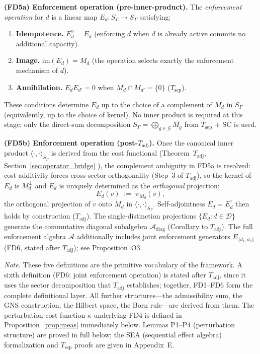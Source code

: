 \documentclass[11pt]{article}
\theoremstyle{remark}
\begin{document}
\begin{tcolorbox}[defbox, title={$\mathrm{FD5}$ (Enforcement Operation): Two-Stage Definition}]

\noindent\textbf{(FD5a) Enforcement operation (pre-inner-product).}
The \emph{enforcement operation} for $d$ is a linear map $E_d: S_\Gamma \to S_\Gamma$ satisfying:
\begin{enumerate}[nosep,leftmargin=2em,itemsep=2pt,label=(\alph*)]
  \item \textbf{Idempotence.}  $E_d^2 = E_d$ (enforcing $d$ when $d$ is already active commits no additional capacity).
  \item \textbf{Image.}  $\mathrm{im}(E_d) = M_d$ (the operation selects exactly the enforcement mechanism of $d$).
  \item \textbf{Annihilation.}  $E_d E_{d'} = 0$ when $M_d \cap M_{d'} = \{0\}$ ($T_{\mathrm{sep}}$).
\end{enumerate}
These conditions determine $E_d$ up to the choice of a complement of $M_d$ in $S_\Gamma$ (equivalently, up to the choice of kernel).  No inner product is required at this stage; only the direct-sum decomposition $S_\Gamma = \bigoplus_{g \in \mathcal{G}} M_g$ from $T_{\mathrm{sep}}$ + SC is used.

\medskip
\noindent\textbf{(FD5b) Enforcement operation (post-$T_{\mathrm{adj}}$).}
Once the canonical inner product $\langle\cdot,\cdot\rangle_{S_\Gamma}$ is derived from the cost functional (Theorem~$T_{\mathrm{adj}}$, Section~\ref{sec:operator_bridge} ), the complement ambiguity in FD5a is resolved: cost additivity forces cross-sector orthogonality (Step~3 of $T_{\mathrm{adj}}$), so the kernel of $E_d$ is $M_d^\perp$ and $E_d$ is uniquely determined as the \emph{orthogonal} projection:
\[
E_d(v) \;:=\; \pi_{M_d}(v),
\]
the orthogonal projection of $v$ onto $M_d$ in $\langle\cdot,\cdot\rangle_{S_\Gamma}$.  Self-adjointness $E_d = E_d^\dagger$ then holds by construction ($T_{\mathrm{adj}}$).  The single-distinction projections $\{E_d : d \in \mathcal{D}\}$ generate the commutative diagonal subalgebra $\mathcal{A}_{\mathrm{diag}}$ (Corollary to $T_{\mathrm{adj}}$).  The full enforcement algebra $\mathcal{A}$ additionally includes joint enforcement generators $E_{\{d_1,d_2\}}$ (FD6, stated after $T_{\mathrm{adj}}$); see Proposition~O3.

\medskip
\noindent\textit{Note.} These five definitions are the primitive vocabulary of the framework.  A sixth definition (FD6: joint enforcement operation) is stated after $T_{\mathrm{adj}}$, since it uses the sector decomposition that $T_{\mathrm{adj}}$ establishes; together, FD1--FD6 form the complete definitional layer.  All further structures---the admissibility sum, the GNS construction, the Hilbert space, the Born rule---are derived from them.  The perturbation cost function $\kappa$ underlying FD4 is defined in Proposition~\ref{prop:meas} immediately below.  Lemmas P1--P4 (perturbation structure) are proved in full below; the SEA (sequential effect algebra) formalization and $T_{\mathrm{sep}}$ proofs are given in Appendix~E.

\end{tcolorbox}
\end{document}
